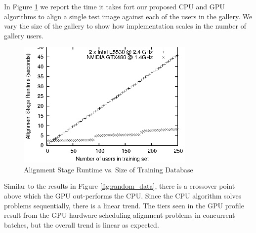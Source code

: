 \documentclass[10pt,twocolumn,letterpaper]{article}
\begin{document}
In Figure \ref{fig:alignment_stage_runtime} we report the time it takes fort
our proposed CPU and GPU algorithms to align a single test image against each
of the users in the gallery.  We vary the size of the gallery to show how
implementation scales in the number of gallery users.
\begin{figure}
\centering
\includegraphics[width=3.4in]{figures/alignment_runtime_graph}
\caption{Alignment Stage Runtime vs. Size of Training Database}
\label{fig:alignment_stage_runtime}
\end{figure}
Similar to the results in Figure \ref{fig:random_data},
there is a crossover point above which the GPU out-performs the CPU.  Since
the CPU algorithm solves problems sequentially, there is a linear trend.  
The tiers seen in the GPU profile result from the GPU hardware scheduling alignment
problems in concurrent batches, but the overall trend is linear as expected.
\end{document}
